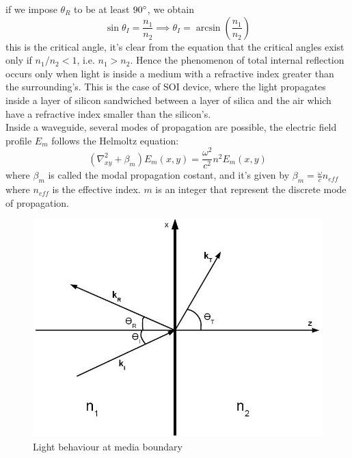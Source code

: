 if we impose $\theta_R$ to be at least $90\degree$, we obtain
\begin{equation}\sin \theta_I = \frac{n_1}{n_2} \implies \theta_I = \arcsin\left(\frac{n_1}{n_2}\right) \end{equation}
this is the critical angle, it's clear from the equation that the critical angles exist only if $n_1/n_2<1$, i.e. $n_1>n_2$. Hence the phenomenon of total internal reflection occurs only when light is inside a medium with a refractive index greater than the surrounding's. This is the case of SOI device, where the light propagates inside a layer of silicon sandwiched between a layer of silica and the air which have a refractive index smaller than the silicon's.\\
Inside a waveguide, several modes of propagation are possible, the electric field profile $E_m$ follows the Helmoltz equation:
\begin{equation}(\nabla_{xy}^2 + \beta_m)E_m(x,y)= \frac{\omega^2}{c^2}n^2E_m(x,y)\end{equation}
where $\beta_m$ is called the modal propagation costant, and it's given by $\beta_m = \frac{\omega}{c}n_{eff}$ where $n_{eff}$ is the effective index. $m$ is an integer that represent the discrete mode of propagation.
\begin{figure}
\centering
\includegraphics[width = .5\textwidth]{img/TIRDiagram3}
\caption{Light behaviour at media boundary}
\label{criticalangle}
\end{figure}

